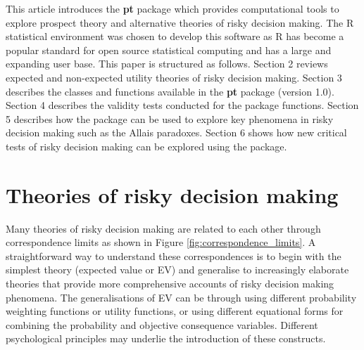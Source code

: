 \documentclass{article}\usepackage[]{graphicx}\usepackage[]{color}
\begin{document}
This article introduces the {\bf pt} package which provides computational tools to explore prospect theory and alternative theories of risky decision making. The R statistical environment \citep*{R_Core_Team_2013} was chosen to develop this software as R has become a popular standard for open source statistical computing and has a large and expanding user base. This paper is structured as follows. Section 2 reviews expected and non-expected
utility theories of risky decision making. Section 3 describes the classes and functions available in the {\bf pt}
package (version 1.0). Section 4 describes the validity tests conducted for the package functions. Section 5
describes how the package can be used to explore key phenomena in risky decision making such as the Allais
paradoxes. Section 6 shows how new critical tests of risky decision making can be explored using the package.

\section{Theories of risky decision making}

Many theories of risky decision making are related to each other through correspondence limits as shown
in Figure \ref{fig:correspondence_limits}. A straightforward way to understand these correspondences is to begin with the
simplest theory (expected value or EV) and generalise to increasingly elaborate theories that provide
more comprehensive accounts of risky decision making phenomena.
The generalisations of EV can be through using different probability weighting functions or utility functions, or using different equational forms for combining the probability and objective consequence variables. Different psychological principles may underlie the introduction of these constructs.
\end{document}
